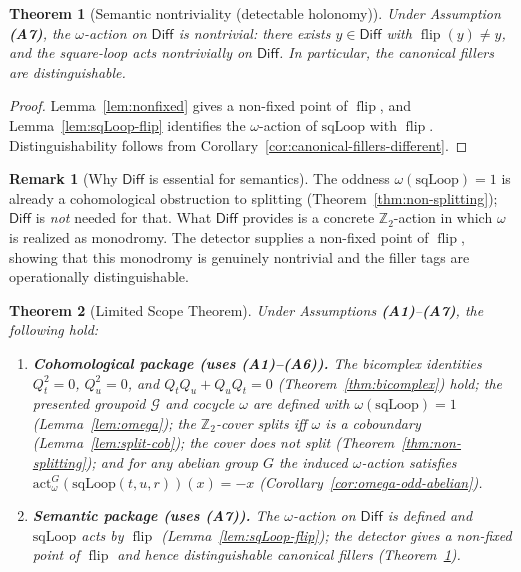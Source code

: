 \documentclass[aps,prl,reprint]{revtex4-2}
\newcommand{\Diff}{\mathsf{Diff}}
\newcommand{\flip}{\operatorname{flip}}
\newcommand{\Ztwo}{\mathbb{Z}_2}
\theoremstyle{definition}
\newtheorem{remark}{Remark}[section]
\theoremstyle{plain}
\newtheorem{theorem}{Theorem}[section]
\begin{document}
\begin{theorem}[Semantic nontriviality (detectable holonomy)]
\label{thm:semantic-nontriviality}
Under Assumption \textbf{(A7)}, the $\omega$-action on $\Diff$ is nontrivial:
there exists $y\in\Diff$ with $\flip(y)\neq y$, and the square-loop acts
nontrivially on $\Diff$. In particular, the canonical fillers are distinguishable.

\end{theorem}

\begin{proof}
Lemma~\ref{lem:nonfixed} gives a non-fixed point of $\flip$, and
Lemma~\ref{lem:sqLoop-flip} identifies the $\omega$-action of $\mathrm{sqLoop}$
with $\flip$. Distinguishability follows from Corollary~\ref{cor:canonical-fillers-different}.
\end{proof}

\begin{remark}[Why $\Diff$ is essential for semantics]
\label{rem:limited-scope-theorem-translation-clean-007}
The oddness $\omega(\mathrm{sqLoop})=1$ is already a cohomological obstruction to
splitting (Theorem~\ref{thm:non-splitting}); $\Diff$ is \emph{not} needed for that.
What $\Diff$ provides is a concrete $\Ztwo$-action in which $\omega$ is realized as
monodromy. The detector supplies a non-fixed point of $\flip$, showing that this
monodromy is genuinely nontrivial and the filler tags are operationally distinguishable.
\end{remark}

\begin{theorem}[Limited Scope Theorem]
\label{thm:limited-scope}
Under Assumptions \textbf{(A1)}--\textbf{(A7)}, the following hold:
\begin{enumerate}[label=\textbf{(\arabic*)},leftmargin=*,itemsep=0.4em]
\item \textbf{Cohomological package (uses \textbf{(A1)}--\textbf{(A6)}).}
The bicomplex identities $Q_t^2=0$, $Q_u^2=0$, and $Q_tQ_u+Q_uQ_t=0$
(Theorem~\ref{thm:bicomplex}) hold; the presented groupoid $\mathcal G$ and cocycle
$\omega$ are defined with $\omega(\mathrm{sqLoop})=1$ (Lemma~\ref{lem:omega});
the $\Ztwo$-cover splits iff $\omega$ is a coboundary (Lemma~\ref{lem:split-cob});
the cover does not split (Theorem~\ref{thm:non-splitting}); and for any abelian
group $G$ the induced $\omega$-action satisfies
$\mathrm{act}^G_{\omega}(\mathrm{sqLoop}(t,u,r))(x)=-x$
(Corollary~\ref{cor:omega-odd-abelian}).
\item \textbf{Semantic package (uses \textbf{(A7)}).}
The $\omega$-action on $\Diff$ is defined and $\mathrm{sqLoop}$ acts by $\flip$
(Lemma~\ref{lem:sqLoop-flip}); the detector gives a non-fixed point of $\flip$
and hence distinguishable canonical fillers (Theorem~\ref{thm:semantic-nontriviality}).
\end{enumerate}
\end{theorem}
\end{document}
